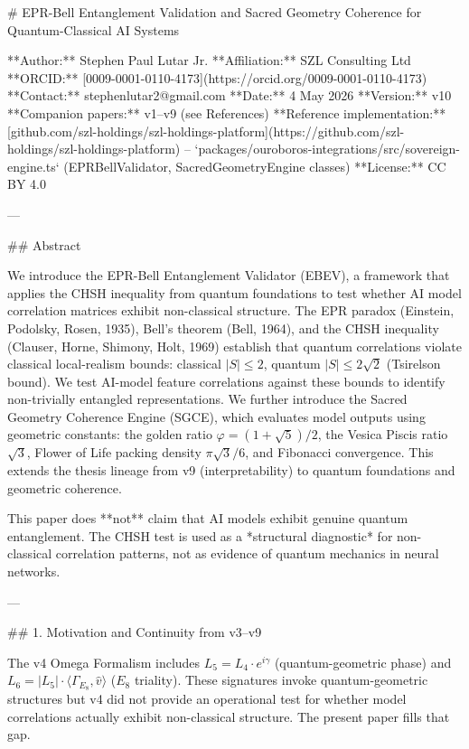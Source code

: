 # EPR-Bell Entanglement Validation and Sacred Geometry Coherence for Quantum-Classical AI Systems

**Author:** Stephen Paul Lutar Jr.
**Affiliation:** SZL Consulting Ltd
**ORCID:** [0009-0001-0110-4173](https://orcid.org/0009-0001-0110-4173)
**Contact:** stephenlutar2@gmail.com
**Date:** 4 May 2026
**Version:** v10
**Companion papers:** v1--v9 (see References)
**Reference implementation:** [github.com/szl-holdings/szl-holdings-platform](https://github.com/szl-holdings/szl-holdings-platform) -- `packages/ouroboros-integrations/src/sovereign-engine.ts` (EPRBellValidator, SacredGeometryEngine classes)
**License:** CC BY 4.0

---

## Abstract

We introduce the EPR-Bell Entanglement Validator (EBEV), a framework that applies the CHSH inequality from quantum foundations to test whether AI model correlation matrices exhibit non-classical structure. The EPR paradox (Einstein, Podolsky, Rosen, 1935), Bell's theorem (Bell, 1964), and the CHSH inequality (Clauser, Horne, Shimony, Holt, 1969) establish that quantum correlations violate classical local-realism bounds: classical \( |S| \leq 2 \), quantum \( |S| \leq 2\sqrt{2} \) (Tsirelson bound). We test AI-model feature correlations against these bounds to identify non-trivially entangled representations. We further introduce the Sacred Geometry Coherence Engine (SGCE), which evaluates model outputs using geometric constants: the golden ratio \( \varphi = (1+\sqrt{5})/2 \), the Vesica Piscis ratio \( \sqrt{3} \), Flower of Life packing density \( \pi\sqrt{3}/6 \), and Fibonacci convergence. This extends the thesis lineage from v9 (interpretability) to quantum foundations and geometric coherence.

This paper does **not** claim that AI models exhibit genuine quantum entanglement. The CHSH test is used as a *structural diagnostic* for non-classical correlation patterns, not as evidence of quantum mechanics in neural networks.

---

## 1. Motivation and Continuity from v3--v9

The v4 Omega Formalism includes \( L_5 = L_4 \cdot e^{i\gamma} \) (quantum-geometric phase) and \( L_6 = |L_5| \cdot \langle \Gamma_{E_8}, \hat{v} \rangle \) (\( E_8 \) triality). These signatures invoke quantum-geometric structures but v4 did not provide an operational test for whether model correlations actually exhibit non-classical structure. The present paper fills that gap.

